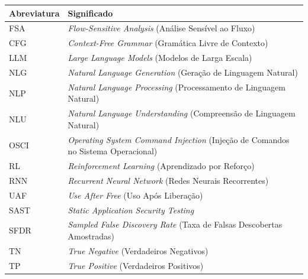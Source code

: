 \documentclass[
    12pt,                %
    openright,           %
    oneside,             %
    a4paper,             %
    english,             %
    brazil               %
]{abntex2}
\begin{document}
\begin{center}
\begin{tabular}{@{}p{3.2cm}p{}@{}}
\toprule
\textbf{Abreviatura} & \textbf{Significado} \\
\midrule
FSA  & \textit{Flow-Sensitive Analysis} (Análise Sensível ao Fluxo) \\
CFG  & \textit{Context-Free Grammar} (Gramática Livre de Contexto) \\
LLM  & \textit{Large Language Models} (Modelos de Larga Escala) \\
NLG  & \textit{Natural Language Generation} (Geração de Linguagem Natural) \\
NLP  & \textit{Natural Language Processing} (Processamento de Linguagem Natural) \\
NLU  & \textit{Natural Language Understanding} (Compreensão de Linguagem Natural) \\
OSCI & \textit{Operating System Command Injection} (Injeção de Comandos no Sistema Operacional) \\
RL   & \textit{Reinforcement Learning} (Aprendizado por Reforço) \\
RNN  & \textit{Recurrent Neural Network} (Redes Neurais Recorrentes) \\
UAF  & \textit{Use After Free} (Uso Após Liberação) \\
SAST & \textit{Static Application Security Testing} \\
SFDR & \textit{Sampled False Discovery Rate} (Taxa de Falsas Descobertas Amostradas) \\
TN   & \textit{True Negative} (Verdadeiros Negativos) \\
TP   & \textit{True Positive} (Verdadeiros Positivos) \\
\bottomrule
\end{tabular}
\end{center}

\cleardoublepage

\tableofcontents*
\cleardoublepage

\textual

\end{document}
